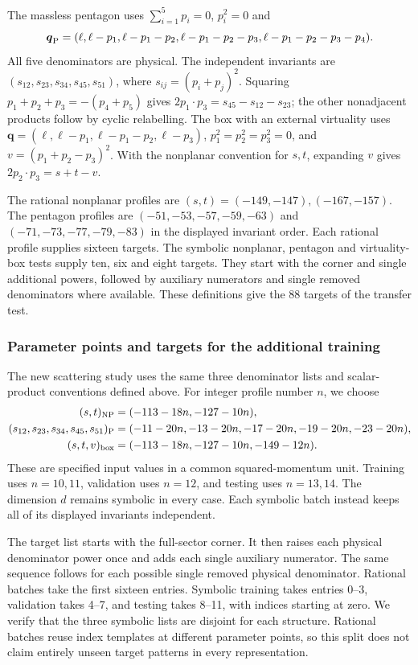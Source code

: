 The massless pentagon uses $\sum_{i=1}^5p_i=0$, $p_i^2=0$ and
\begin{equation}
 \boldsymbol q_{\rm P}=(\ell,\ell-p_1,\ell-p_1-p_2,
 \ell-p_1-p_2-p_3,\ell-p_1-p_2-p_3-p_4).
\end{equation}
All five denominators are physical. The independent invariants are $(s_{12},s_{23},s_{34},s_{45},s_{51})$, where $s_{ij}=(p_i+p_j)^2$. Squaring $p_1+p_2+p_3=-(p_4+p_5)$ gives $2p_1\cdot p_3=s_{45}-s_{12}-s_{23}$; the other nonadjacent products follow by cyclic relabelling. The box with an external virtuality uses $\boldsymbol q=(\ell,\ell-p_1,\ell-p_1-p_2,\ell-p_3)$, $p_1^2=p_2^2=p_3^2=0$, and $v=(p_1+p_2-p_3)^2$. With the nonplanar convention for $s,t$, expanding $v$ gives $2p_2\cdot p_3=s+t-v$.

The rational nonplanar profiles are $(s,t)=(-149,-147),(-167,-157)$. The pentagon profiles are $(-51,-53,-57,-59,-63)$ and $(-71,-73,-77,-79,-83)$ in the displayed invariant order. Each rational profile supplies sixteen targets. The symbolic nonplanar, pentagon and virtuality-box tests supply ten, six and eight targets. They start with the corner and single additional powers, followed by auxiliary numerators and single removed denominators where available. These definitions give the 88 targets of the transfer test.

\subsubsection{Parameter points and targets for the additional training}
The new scattering study uses the same three denominator lists and scalar-product conventions defined above. For integer profile number $n$, we choose
\begin{align}
 (s,t)_{\rm NP}&=(-113-18n,-127-10n),\\
 (s_{12},s_{23},s_{34},s_{45},s_{51})_{\rm P}
 &=(-11-20n,-13-20n,-17-20n,-19-20n,-23-20n),\\
 (s,t,v)_{\rm box}&=(-113-18n,-127-10n,-149-12n).
\end{align}
These are specified input values in a common squared-momentum unit. Training uses $n=10,11$, validation uses $n=12$, and testing uses $n=13,14$. The dimension $d$ remains symbolic in every case. Each symbolic batch instead keeps all of its displayed invariants independent.

The target list starts with the full-sector corner. It then raises each physical denominator power once and adds each single auxiliary numerator. The same sequence follows for each possible single removed physical denominator. Rational batches take the first sixteen entries. Symbolic training takes entries 0--3, validation takes 4--7, and testing takes 8--11, with indices starting at zero. We verify that the three symbolic lists are disjoint for each structure. Rational batches reuse index templates at different parameter points, so this split does not claim entirely unseen target patterns in every representation.

